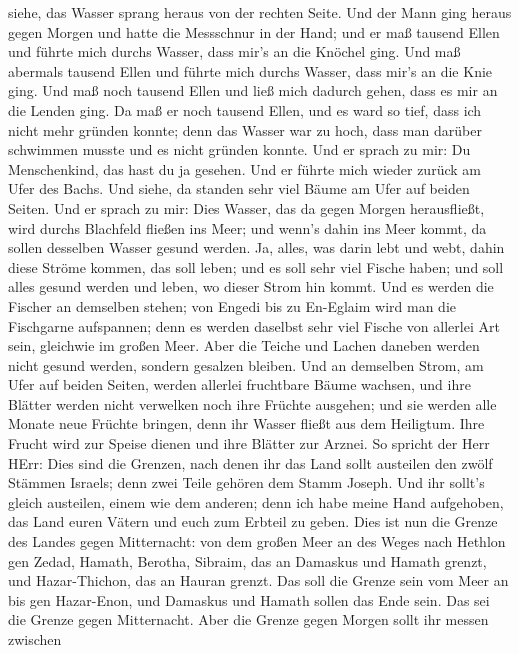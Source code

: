 siehe, das Wasser sprang heraus von der rechten Seite.  Und
der Mann ging heraus gegen Morgen und hatte die Messschnur in der Hand;
und er maß tausend Ellen und führte mich durchs Wasser, dass mir's an
die Knöchel ging.  Und maß abermals tausend Ellen und führte
mich durchs Wasser, dass mir's an die Knie ging. Und maß noch tausend
Ellen und ließ mich dadurch gehen, dass es mir an die Lenden ging.
 Da maß er noch tausend Ellen, und es ward so tief, dass ich
nicht mehr gründen konnte; denn das Wasser war zu hoch, dass man darüber
schwimmen musste und es nicht gründen konnte.  Und er sprach
zu mir: Du Menschenkind, das hast du ja gesehen. Und er führte mich
wieder zurück am Ufer des Bachs.  Und siehe, da standen sehr
viel Bäume am Ufer auf beiden Seiten.  Und er sprach zu mir:
Dies Wasser, das da gegen Morgen herausfließt, wird durchs Blachfeld
fließen ins Meer; und wenn's dahin ins Meer kommt, da sollen desselben
Wasser gesund werden.  Ja, alles, was darin lebt und webt,
dahin diese Ströme kommen, das soll leben; und es soll sehr viel Fische
haben; und soll alles gesund werden und leben, wo dieser Strom hin
kommt.  Und es werden die Fischer an demselben stehen; von
Engedi bis zu En-Eglaim wird man die Fischgarne aufspannen; denn es
werden daselbst sehr viel Fische von allerlei Art sein, gleichwie im
großen Meer.  Aber die Teiche und Lachen daneben werden
nicht gesund werden, sondern gesalzen bleiben.  Und an
demselben Strom, am Ufer auf beiden Seiten, werden allerlei fruchtbare
Bäume wachsen, und ihre Blätter werden nicht verwelken noch ihre Früchte
ausgehen; und sie werden alle Monate neue Früchte bringen, denn ihr
Wasser fließt aus dem Heiligtum. Ihre Frucht wird zur Speise dienen und
ihre Blätter zur Arznei.  So spricht der Herr HErr: Dies
sind die Grenzen, nach denen ihr das Land sollt austeilen den zwölf
Stämmen Israels; denn zwei Teile gehören dem Stamm Joseph. 
Und ihr sollt's gleich austeilen, einem wie dem anderen; denn ich habe
meine Hand aufgehoben, das Land euren Vätern und euch zum Erbteil zu
geben.  Dies ist nun die Grenze des Landes gegen
Mitternacht: von dem großen Meer an des Weges nach Hethlon gen Zedad,
 Hamath, Berotha, Sibraim, das an Damaskus und Hamath
grenzt, und Hazar-Thichon, das an Hauran grenzt.  Das soll
die Grenze sein vom Meer an bis gen Hazar-Enon, und Damaskus und Hamath
sollen das Ende sein. Das sei die Grenze gegen Mitternacht.
 Aber die Grenze gegen Morgen sollt ihr messen zwischen
